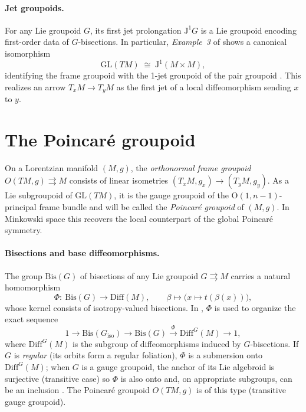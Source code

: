 \documentclass[11pt]{article}
\newcommand{\Bis}{\mathrm{Bis}}
\newcommand{\Diff}{\mathrm{Diff}}
\newcommand{\GL}{\mathrm{GL}}
\newcommand{\OO}{\mathrm{O}}
\newcommand{\JJ}{\mathrm{J}}
\begin{document}
\paragraph{Jet groupoids.}
For any Lie groupoid $G$, its first jet prolongation $\JJ^1G$ is a Lie groupoid encoding first-order data of $G$-bisections. In particular, \emph{Example~3} of \citet{CostaA2015} shows a canonical isomorphism
\begin{equation}
  \GL(TM)\;\cong\;\JJ^1(M\times M),
  \label{eq:GLisJ1Pair}
\end{equation}
identifying the frame groupoid with the 1-jet groupoid of the pair groupoid \citep[Ex.~3]{CostaA2015}. This realizes an arrow $T_xM\!\to\! T_yM$ as the first jet of a local diffeomorphism sending $x$ to $y$.

\section{The Poincar\'e groupoid}
On a Lorentzian manifold $(M,g)$, the \emph{orthonormal frame groupoid} $O(TM,g)\rightrightarrows M$ consists of linear isometries $(T_xM,g_x)\to (T_yM,g_y)$. As a Lie subgroupoid of $\GL(TM)$, it is the gauge groupoid of the $\OO(1,n\!-\!1)$-principal frame bundle and will be called the \emph{Poincar\'e groupoid} of $(M,g)$. In Minkowski space this recovers the local counterpart of the global Poincar\'e symmetry.

\paragraph{Bisections and base diffeomorphisms.}
The group $\Bis(G)$ of bisections of any Lie groupoid $G\rightrightarrows M$ carries a natural homomorphism
\begin{equation}
  \Phi:\ \Bis(G)\longrightarrow \Diff(M),\qquad \beta\longmapsto\bigl(x\mapsto t(\beta(x))\bigr),
  \label{eq:PhiBisToDiff}
\end{equation}
whose kernel consists of isotropy-valued bisections. In \citet[Eq.~(42)--(43), p.~12]{CostaA2015}, $\Phi$ is used to organize the exact sequence
\[
  1\longrightarrow \Bis(G_{\mathrm{iso}})\longrightarrow \Bis(G)\xrightarrow{\ \Phi\ }\Diff^G(M)\longrightarrow 1,
\]
where $\Diff^G(M)$ is the subgroup of diffeomorphisms induced by $G$-bisections. If $G$ is \emph{regular} (its orbits form a regular foliation), $\Phi$ is a submersion onto $\Diff^G(M)$; when $G$ is a gauge groupoid, the anchor of its Lie algebroid is surjective (transitive case) so $\Phi$ is also onto and, on appropriate subgroups, can be an inclusion \citep[\S4--\S5]{CostaA2015}. The Poincar\'e groupoid $O(TM,g)$ is of this type (transitive gauge groupoid).
\end{document}
